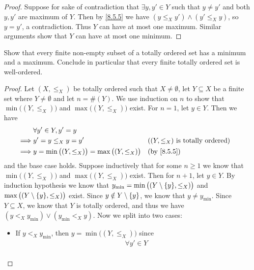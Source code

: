 \begin{proof}
  Suppose for sake of contradiction that \(\exists y, y' \in Y\) such that \(y \neq y'\) and both \(y, y'\) are maximum of \(Y\).
  Then by \cref{8.5.5} we have \((y \leq_X y') \land (y' \leq_X y)\), so \(y = y'\), a contradiction.
  Thus \(Y\) can have at most one maximum.
  Similar arguments show that \(Y\) can have at most one minimum.
\end{proof}

\begin{ex}\label{ex:8.5.8}
  Show that every finite non-empty subset of a totally ordered set has a minimum and a maximum.
  Conclude in particular that every finite totally ordered set is well-ordered.
\end{ex}

\begin{proof}
  Let \((X, \leq_X)\) be totally ordered such that \(X \neq \emptyset\), let \(Y \subseteq X\) be a finite set where \(Y \neq \emptyset\) and let \(n = \#(Y)\).
  We use induction on \(n\) to show that \(\min\big((Y, \leq_X)\big)\) and \(\max\big((Y, \leq_X)\big)\) exist.
  For \(n = 1\), let \(y \in Y\).
  Then we have
  \begin{align*}
             & \forall y' \in Y, y' = y                                                                                   \\
    \implies & y' = y \leq_X y = y'                                      &  & \text{(\((Y, \leq_X)\) is totally ordered)} \\
    \implies & y = \min\big((Y, \leq_X)\big) = \max\big((Y, \leq_X)\big) &  & \by{8.5.5}
  \end{align*}
  and the base case holds.
  Suppose inductively that for some \(n \geq 1\) we know that \(\min\big((Y, \leq_X)\big)\) and \(\max\big((Y, \leq_X)\big)\) exist.
  Then for \(n + 1\), let \(y \in Y\).
  By induction hypothesis we know that \(y_{\min} = \min\big((Y \setminus \set{y}, \leq_X)\big)\) and \(\max\big((Y \setminus \set{y}, \leq_X)\big)\) exist.
  Since \(y \notin Y \setminus \left\lbrace y\right\rbrace\), we know that \(y \neq y_{\min}\).
  Since \(Y \subseteq X\), we know that \(Y\) is totally ordered, and thus we have \((y <_X y_{\min}) \lor (y_{\min} <_X y)\).
  Now we split into two cases:
  \begin{itemize}
    \item If \(y <_X y_{\min}\), then \(y = \min\big((Y, \leq_X)\big)\) since
          \begin{align*}
                     & \forall y' \in Y                                                                       \\

\end{align*}
\end{itemize}
\end{proof}
